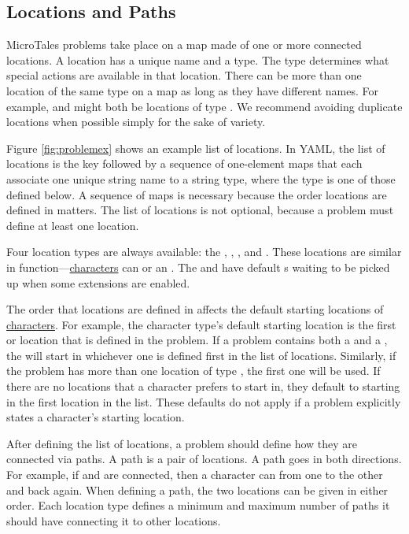 \documentclass{nilreport}
\begin{document}
\newpage

\subsection{Locations and Paths} \label{sec:locations}

MicroTales problems take place on a map made of one or more connected locations. A location has a unique name and a type. The type determines what special actions are available in that location. There can be more than one location of the same type on a map as long as they have different names. For example,  and  might both be locations of type . We recommend avoiding duplicate locations when possible simply for the sake of variety.

Figure \ref{fig:problemex} shows an example list of locations. In YAML, the list of locations is the key  followed by a sequence of one-element maps that each associate one unique string name to a string type, where the type is one of those defined below. A sequence of maps is necessary because the order locations are defined in matters. The list of locations is not optional, because a problem must define at least one location.

Four location types are always available: the , , , and . These locations are similar in function---\hyperref[sec:characters]{characters} can  or  an . The  and  have default s waiting to be picked up when some extensions are enabled.

The order that locations are defined in affects the default starting locations of \hyperref[sec:characters]{characters}. For example, the  character type's default starting location is the first  or  location that is defined in the problem. If a problem contains both a  and a , the  will start in whichever one is defined first in the list of locations. Similarly, if the problem has more than one location of type , the first one will be used. If there are no locations that a character prefers to start in, they default to starting in the first location in the list. These defaults do not apply if a problem explicitly states a character's starting location.

After defining the list of locations, a problem should define how they are connected via paths. A path is a pair of locations. A path goes in both directions. For example, if  and  are connected, then a character can  from one to the other and back again. When defining a path, the two locations can be given in either order. Each location type defines a minimum and maximum number of paths it should have connecting it to other locations.
\end{document}
